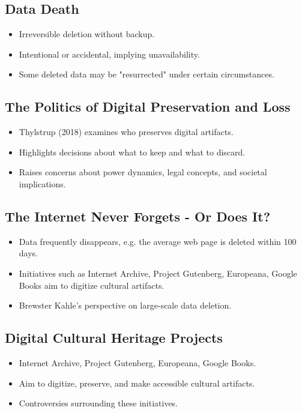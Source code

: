 \documentclass{article}
\begin{document}
\subsection*{Data Death}
\begin{itemize}
  \item Irreversible deletion without backup.
  \item Intentional or accidental, implying unavailability.
  \item Some deleted data may be "resurrected" under certain circumstances.
\end{itemize}

\subsection*{The Politics of Digital Preservation and Loss}
\begin{itemize}
  \item Thylstrup (2018) examines who preserves digital artifacts.
  \item Highlights decisions about what to keep and what to discard.
  \item Raises concerns about power dynamics, legal concepts, and societal implications.
\end{itemize}

\subsection*{The Internet Never Forgets - Or Does It?}
\begin{itemize}
  \item Data frequently disappears, e.g. the average web page is deleted within 100 days.
  \item Initiatives such as Internet Archive, Project Gutenberg, Europeana, Google Books aim to digitize cultural artifacts.
  \item Brewster Kahle's perspective on large-scale data deletion.
\end{itemize}

\subsection*{Digital Cultural Heritage Projects}
\begin{itemize}
  \item Internet Archive, Project Gutenberg, Europeana, Google Books.
  \item Aim to digitize, preserve, and make accessible cultural artifacts.
  \item Controversies surrounding these initiatives.
\end{itemize}
\end{document}
